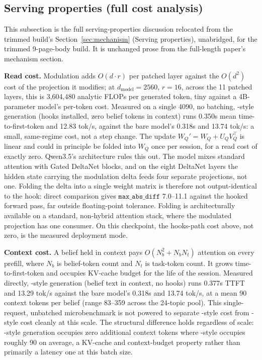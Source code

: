 \subsection{Serving properties (full cost analysis)}
\label{app:serving}

This subsection is the full serving-properties discussion relocated from the trimmed
build's Section~\ref{sec:mechanism} (Serving properties), unabridged, for the trimmed
9-page-body build. It is unchanged prose from the full-length paper's mechanism section.

\textbf{Read cost.} Modulation adds \(O(d \cdot r)\) per patched layer against the
\(O(d^2)\) cost of the projection it modifies; at \(d_{\text{model}}=2560\), \(r=16\),
across the 11 patched layers, this is 3,604,480 analytic FLOPs per generated token,
tiny against a 4B-parameter model's per-token cost. Measured on a single 4090, no
batching, \condF{}-style generation (hooks installed, zero belief tokens in context)
runs 0.350s mean time-to-first-token and 12.83 tok/s, against the bare model's 0.318s
and 13.74 tok/s: a small, same-regime cost, not a step change. The update
\(W_Q' = W_Q + U_Q V_Q^\top\) is linear and could in principle be folded into \(W_Q\)
once per session, for a read cost of exactly zero. Qwen3.5's architecture rules this
out. The model mixes standard attention with Gated DeltaNet blocks, and on the eight
DeltaNet layers the hidden state carrying the modulation delta feeds four separate
projections, not one. Folding the delta into a single weight matrix is therefore not
output-identical to the hook: direct comparison gives \(\texttt{max\_abs\_diff}\)
7.0--11.1 against the hooked forward pass, far outside floating-point tolerance.
Folding is architecturally available on a standard, non-hybrid attention stack, where
the modulated projection has one consumer. On this checkpoint, the hooks-path cost
above, not zero, is the measured deployment mode.

\textbf{Context cost.} A belief held in context pays \(O(N_b^2 + N_b N_t)\) attention on
every prefill, where \(N_b\) is belief-token count and \(N_t\) is task-token count. It
grows time-to-first-token and occupies KV-cache budget for the life of the session.
Measured directly, \condB{}-style
generation (belief text in context, no hooks) runs 0.377s TTFT and 13.29 tok/s against
the bare model's 0.318s and 13.74 tok/s, at a mean 90 context tokens per belief (range
83--359 across the 24-topic pool). This single-request, unbatched microbenchmark is not
powered to separate \condB{}-style cost from \condF{}-style cost cleanly at this scale.
The structural difference holds regardless of scale: \condF{}-style generation
occupies zero additional context tokens where \condB{}-style occupies roughly 90 on
average, a KV-cache and context-budget property rather than primarily a latency one at
this batch size.

